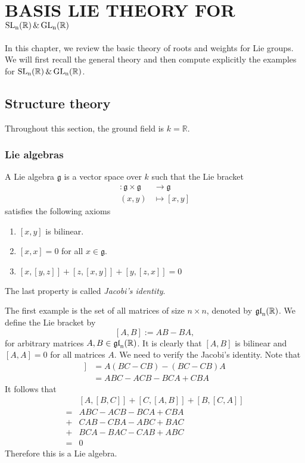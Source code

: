

\chapter{BASIS LIE THEORY FOR  $\operatorname{\text{SL}_n(\mathbb{R})}\& \operatorname{\text{GL}_n(\mathbb{R})}$}
In this chapter, we review the basic theory of roots and weights for Lie groups. We will first recall the
general theory and then compute explicitly the examples for $\operatorname{\text{SL}_n(\mathbb{R})}\& \operatorname{\text{GL}_n(\mathbb{R})}$.
\section{Structure theory}
Throughout this section, the ground field is $k=\mathbb{R}$.
\subsection{Lie algebras}
A Lie algebra $\mathfrak{g}$ is a vector space over $k$ such that the Lie bracket
\begin{align*}
    [\cdot,\cdot] \colon \mathfrak{g} \times \mathfrak{g} & \to \mathfrak{g} \\
    (x,y   )                                              & \mapsto [x,y]
\end{align*}
satisfies the following axioms
\begin{enumerate}
    \item $[x,y]$ is bilinear.
    \item $[x,x]=0$ for all $x \in \mathfrak{g}$.
    \item $[x,[y,z]]+ [z,[x,y]] + [y,[z,x]] =0$
\end{enumerate}
The last property is called \textit{Jacobi's identity}.
\begin{example}
    The first example is the set of all matrices of size $n \times n$, denoted by $\operatorname{\mathfrak{gl}_n(\mathbb{R})}$. We
    define the Lie bracket by
    \[[A,B] :=AB-BA,\]
    for arbitrary matrices $A,B \in \operatorname{\mathfrak{gl}_n(\mathbb{R})}$. It is clearly that $[A,B]$ is bilinear and $[A,A]=0$ for all matrices $A$.
    We need to verify the Jacobi's identity. Note that
    \begin{align*}
        [A,[B,C]] & = A(BC-CB)-(BC-CB)A     \\
                  & = ABC - ACB - BCA + CBA
    \end{align*}
    It follows that
    \begin{align*}
        &[A,[B,C]]+[C,[A,B]] + [B,[C,A]]\\
        = &ABC - ACB - BCA + CBA\\
        +&CAB-CBA-ABC+BAC\\
        +&BCA-BAC-CAB+ABC\\
        =&0
    \end{align*}
Therefore this is a Lie algebra.
\end{example}
